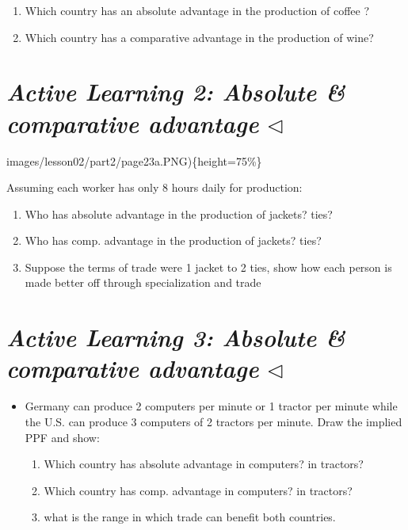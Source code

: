\documentclass[
]{book}
\begin{document}
\begin{enumerate}
\def\labelenumi{\alph{enumi}.}
\item
  Which country has an absolute advantage in the production of coffee ?
\item
  Which country has a comparative advantage in the production of wine?
\end{enumerate}

\hypertarget{active-learning-2-absolute-comparative-advantage-triangleleft}{%
\section{\texorpdfstring{\emph{Active Learning 2: Absolute \& comparative advantage} \(\triangleleft\)}{Active Learning 2: Absolute \& comparative advantage \textbackslash triangleleft}}\label{active-learning-2-absolute-comparative-advantage-triangleleft}}

images/lesson02/part2/page23a.PNG)\{height=75\%\}

\small

Assuming each worker has only 8 hours daily for production:

\begin{enumerate}
\def\labelenumi{\alph{enumi}.}
\item
  Who has absolute advantage in the production of jackets? ties?
\item
  Who has comp. advantage in the production of jackets? ties?
\item
  Suppose the terms of trade were 1 jacket to 2 ties, show how each person is made better off through specialization and trade
\end{enumerate}

\hypertarget{active-learning-3-absolute-comparative-advantage-triangleleft}{%
\section{\texorpdfstring{\emph{Active Learning 3: Absolute \& comparative advantage} \(\triangleleft\)}{Active Learning 3: Absolute \& comparative advantage \textbackslash triangleleft}}\label{active-learning-3-absolute-comparative-advantage-triangleleft}}

\begin{itemize}
\item
  Germany can produce 2 computers per minute or 1 tractor per minute while the U.S. can produce 3 computers of 2 tractors per minute. Draw the implied PPF and show:

  \begin{enumerate}
  \def\labelenumi{\alph{enumi}.}
  \item
    Which country has absolute advantage in computers? in tractors?
  \item
    Which country has comp. advantage in computers? in tractors?
  \item
    what is the range in which trade can benefit both countries.
  \end{enumerate}
\end{itemize}
\end{document}
